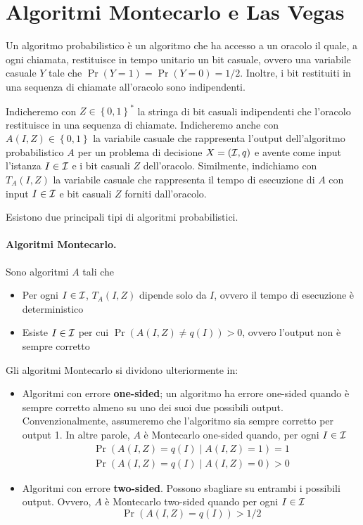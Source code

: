 \section{Algoritmi Montecarlo e Las Vegas}

Un algoritmo probabilistico è un algoritmo che ha accesso a un oracolo il quale, a ogni chiamata, restituisce in tempo unitario un bit casuale, ovvero una variabile casuale $Y$ tale che $\Pr(Y = 1) = \Pr(Y = 0) = 1/2$. Inoltre, i bit restituiti in una sequenza di chiamate all'oracolo sono indipendenti.

Indicheremo con $Z \in \left\{0,1\right\}^\ast$ la stringa di bit casuali indipendenti che l'oracolo restituisce in una sequenza di chiamate. Indicheremo anche con $A(I, Z) \in \left\{0,1\right\}$ la variabile casuale che rappresenta l'output dell'algoritmo probabilistico $A$ per un problema di decisione $X = (\mathcal{I}, q)$ e avente come input l'istanza $I \in \mathcal{I}$ e i bit casuali $Z$ dell'oracolo. Similmente, indichiamo con $T_A (I, Z)$ la variabile casuale che rappresenta il tempo di esecuzione di $A$ con input $I \in \mathcal{I}$ e bit casuali $Z$ forniti dall'oracolo.

Esistono due principali tipi di algoritmi probabilistici.

\paragraph{Algoritmi Montecarlo.} Sono algoritmi $A$ tali che
\begin{itemize}
    \item Per ogni $I \in \mathcal{I}$, $T_A (I, Z)$ dipende solo da $I$, ovvero il tempo di esecuzione è deterministico

    \item Esiste $I \in \mathcal{I}$ per cui $\Pr \left(A(I, Z) \neq q(I)\right) > 0$, ovvero l'output non è sempre corretto
\end{itemize}

Gli algoritmi Montecarlo si dividono ulteriormente in:
\begin{itemize}
    \item Algoritmi con errore \textbf{one-sided}; un algoritmo ha errore one-sided quando è sempre corretto almeno su uno dei suoi due possibili output. Convenzionalmente, assumeremo che l'algoritmo sia sempre corretto per output 1. In altre parole, $A$ è Montecarlo one-sided quando, per ogni $I \in \mathcal{I}$
    \begin{align*}
    	\Pr \left(A(I, Z) = q(I) \mid A(I, Z) = 1\right) = 1 \\
    	\Pr \left(A(I, Z) = q(I) \mid A(I, Z) = 0\right) > 0
    \end{align*}

    \item Algoritmi con errore \textbf{two-sided}. Possono sbagliare su entrambi i possibili output. Ovvero, $A$ è Montecarlo two-sided quando per ogni $I \in \mathcal{I}$
    $$ \Pr\left(A(I,Z) = q(I)\right) > 1/2 $$
\end{itemize}

